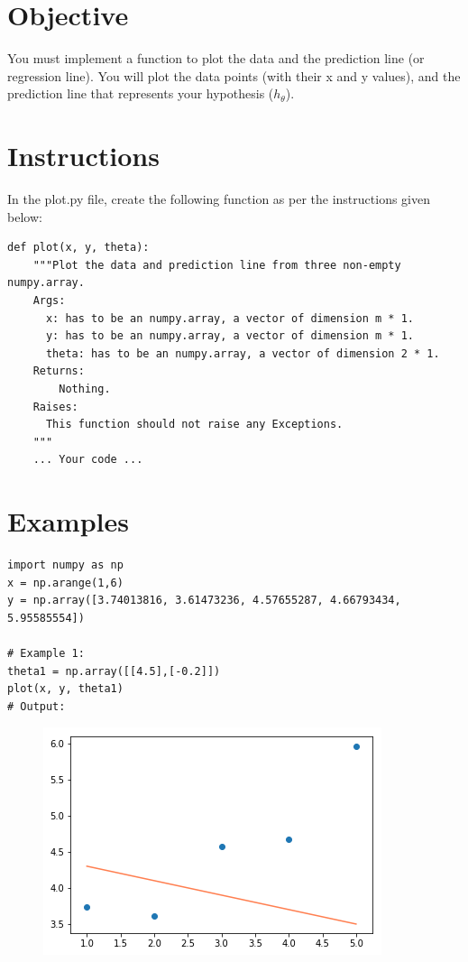 \documentclass{42-en}
\begin{document}
\section*{Objective}
You must implement a function to plot the data and the prediction line (or regression line).  
You will plot the data points (with their x and y values), and the prediction line that represents your hypothesis ($h_{\theta}$).

\newpage

\section*{Instructions}
In the plot.py file, create the following function as per the instructions given below:

\begin{verbatim}
def plot(x, y, theta):
    """Plot the data and prediction line from three non-empty numpy.array.
    Args:
      x: has to be an numpy.array, a vector of dimension m * 1.
      y: has to be an numpy.array, a vector of dimension m * 1.
      theta: has to be an numpy.array, a vector of dimension 2 * 1.
    Returns:
        Nothing.
    Raises:
      This function should not raise any Exceptions.
    """
    ... Your code ...
\end{verbatim}

\section*{Examples}

\begin{verbatim}
import numpy as np
x = np.arange(1,6)
y = np.array([3.74013816, 3.61473236, 4.57655287, 4.66793434, 5.95585554])

# Example 1:
theta1 = np.array([[4.5],[-0.2]])
plot(x, y, theta1)
# Output:
\end{verbatim}

\begin{figure}[H]
  \centering
  \includegraphics[scale=0.6]{assets/plot1.png}
\end{figure}
\end{document}
